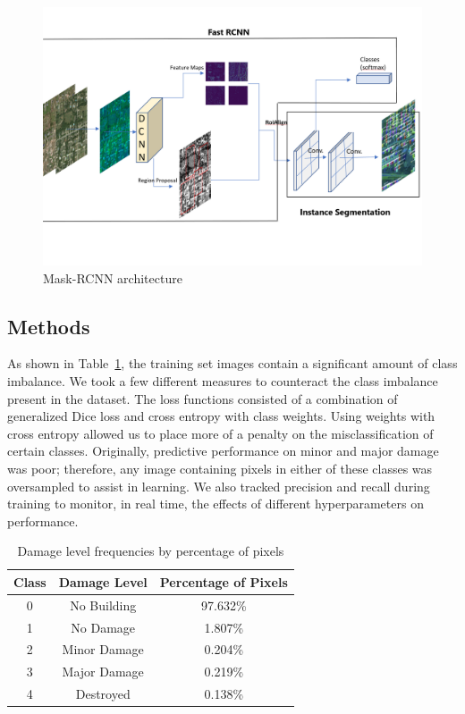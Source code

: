 \documentclass[conference]{IEEEtran}
\begin{document}
\begin{figure}[h!]
\centering\includegraphics[width=1\linewidth]{MaskRCNN.png}
\caption{Mask-RCNN architecture}
\label{fig:MaskRCNN}
\end{figure}

\subsection{Methods}
As shown in Table~\ref{pixels}, the training set images contain a significant amount of class imbalance. We took a few different measures to counteract the class imbalance present in the dataset. The loss functions consisted of a combination of generalized Dice loss\cite{a9} and cross entropy with class weights. Using weights with cross entropy allowed us to place more of a penalty on the misclassification of certain classes. Originally, predictive performance on minor and major damage was poor; therefore, any image containing pixels in either of these classes was oversampled to assist in learning. We also tracked precision and recall during training to monitor, in real time, the effects of different hyperparameters on performance.

\begin{table}[htbp]
\begin{center}
\begin{tabular}{||c|c|c||}
\hline
\textbf{Class} & \textbf{Damage Level} & \textbf{Percentage of Pixels} \\
\hline\hline
0 & No Building & 97.632\% \\ 
1 & No Damage & 1.807\% \\
2 & Minor Damage & 0.204\% \\
3 & Major Damage & 0.219\% \\
4 & Destroyed & 0.138\% \\
\hline
\end{tabular}
\end{center}
\caption{Damage level frequencies by percentage of pixels}
\label{pixels}
\end{table}
\end{document}
